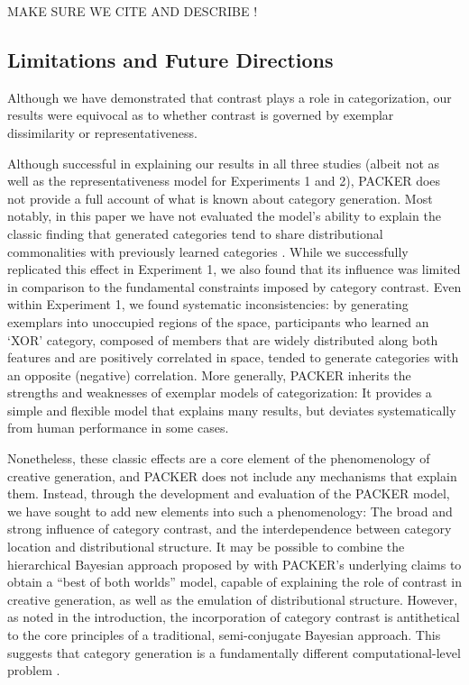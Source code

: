 \documentclass[12pt]{article}
\begin{document}
\begin{flushleft}
MAKE SURE WE CITE AND DESCRIBE \citet{thomas98}!

\subsection{Limitations and Future Directions}
Although we have demonstrated that contrast plays a role in categorization, our results were equivocal as to whether contrast is governed by exemplar dissimilarity or representativeness. 

Although successful in explaining our results in all three studies (albeit not as well as the representativeness model for Experiments 1 and 2), PACKER does not provide a full account of what is known about category generation. Most notably, in this paper we have not evaluated the model's ability to explain the classic finding that generated categories tend to share distributional commonalities with previously learned categories \citep[see][]{jern2013probabilistic,ward1994structured}. While we successfully replicated this effect in Experiment 1, we also found that its influence was limited in comparison to the fundamental constraints imposed by category contrast. Even within Experiment 1, we found systematic inconsistencies: by generating exemplars into unoccupied regions of the space, participants who learned an `XOR' category, composed of members that are widely distributed along both features and are positively correlated in space, tended to generate categories with an opposite (negative) correlation. More generally, PACKER inherits the strengths and weaknesses of exemplar models of categorization: It provides a simple and flexible model that explains many results, but deviates systematically from human performance in some cases.

Nonetheless, these classic effects are a core element of the phenomenology of creative generation, and PACKER does not include any mechanisms that explain them. Instead, through the development and evaluation of the PACKER model, we have sought to add new elements into such a phenomenology: The broad and strong influence of category contrast, and the interdependence between category location and distributional structure. It may be possible to combine the hierarchical Bayesian approach proposed by \cite{jern2013probabilistic} with PACKER's underlying claims to obtain a ``best of both worlds'' model, capable of explaining the role of contrast in creative generation, as well as the emulation of distributional structure. However, as noted in the introduction, the incorporation of category contrast is antithetical to the core principles of a traditional, semi-conjugate Bayesian approach. This suggests that category generation is a fundamentally different computational-level problem \citep[different from those posed by][]{jern2013probabilistic,kemp2014taxonomy}. 


\end{flushleft}
\end{document}
